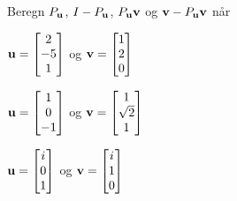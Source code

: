 \begin{oppgave}
Beregn $P_{\V u}$, $I-P_{\V u}$, $P_{\V u}\V v$ og $\V v-P_{\V u}\V v$ når \\[2pt]
\begin{punkt}
$\V{u}=\vvv{2}{-5}{1}$ og $\V{v}=\vvv{1}{2}{0}$\\[4pt]
\end{punkt}

\begin{punkt}
$\V{u}=\vvv{1}{0}{-1}$ og $\V{v}=\vvv{1}{\sqrt{2}}{1}$\\[4pt]
\end{punkt}

\begin{punkt}
$\V{u}=\vvv{i}{0}{1}$ og $\V{v}=\vvv{i}{1}{0}$\\[4pt]
\end{punkt}

\end{oppgave}


